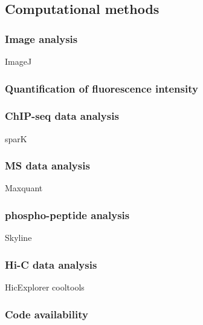 \subsection{Computational methods}
\subsubsection{Image analysis}
ImageJ
\subsubsection{Quantification of fluorescence intensity}
\subsubsection{ChIP-seq data analysis}
sparK
\subsubsection{MS data analysis}
Maxquant
\subsubsection{phospho-peptide analysis}
Skyline
\subsubsection{Hi-C data analysis}
HicExplorer 
cooltools
\subsubsection{Code availability}